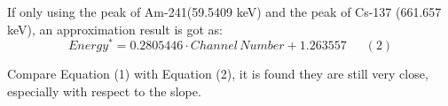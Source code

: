 If only using the peak of Am-241(59.5409 keV) and the peak of Cs-137 (661.657 keV), an approximation result is got as:
\[{Energy^*}=0.2805446 \cdot Channel\,Number+1.263557\,\,\,\,\,\,\,\,\,(2)\]

Compare Equation (1) with Equation (2), it is found they are still very close, especially with respect to the slope.
